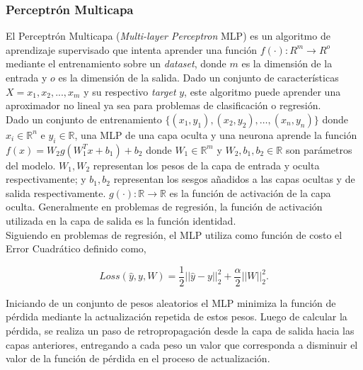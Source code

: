 \documentclass[spanish]{article}
\begin{document}
            
            \subsubsection{Perceptrón Multicapa}
                
                El Perceptrón Multicapa (\emph{Multi-layer Perceptron} MLP) es un algoritmo de aprendizaje supervisado que intenta aprender una función
                $f(\cdot): R^m \rightarrow R^o$ mediante el entrenamiento sobre un \emph{dataset}, donde $m$ es la dimensión de la entrada y $o$
                es la dimensión de la salida. Dado un conjunto de características $X = {x_1, x_2, ..., x_m}$ y su respectivo \emph{target} $y$, este algoritmo
                puede aprender una aproximador no lineal ya sea para problemas de clasificación o regresión. \\
                
                Dado un conjunto de entrenamiento $\{(x_1, y_1), (x_2, y_2), \ldots, (x_n, y_n)\}$ donde $x_i \in \mathbb{R}^n$ e $y_i \in \mathbb{R}$, una MLP de una
                capa oculta y una neurona aprende la función $f(x) = W_2 g(W_1^T x + b_1) + b_2$ donde $W_1 \in \mathbb{R}^m$ y $W_2, b_1, b_2 \in \mathbb{R}$ son 
                parámetros del modelo. $W_1, W_2$ representan los pesos de la capa de entrada y oculta respectivamente; y $b_1, b_2$ representan los sesgos añadidos
                a las capas ocultas y de salida respectivamente. $g(\cdot): \mathbb{R} \rightarrow \mathbb{R}$ es la función de activación de la capa oculta. 
                Generalmente en problemas de regresión, la función de activación utilizada en la capa de salida es la función identidad. \\
                
                Siguiendo en problemas de regresión, el MLP utiliza como función de costo el Error Cuadrático definido como,
                
                \begin{equation}
                    Loss(\hat{y},y,W) = \frac{1}{2}||\hat{y} - y ||_2^2 + \frac{\alpha}{2} ||W||_2^2.
                \end{equation}

                Iniciando de un conjunto de pesos aleatorios el MLP minimiza la función de pérdida mediante la actualización repetida de estos pesos. Luego de calcular 
                la pérdida, se realiza un paso de retropropagación desde la capa de salida hacia las capas anteriores, entregando a cada peso un valor que corresponda 
                a disminuir el valor de la función de pérdida en el proceso de actualización. \\
\end{document}

